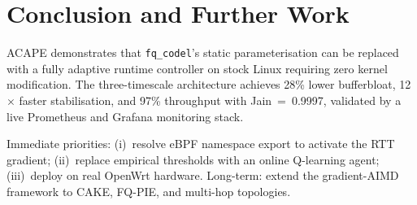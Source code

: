 \documentclass[conference]{IEEEtran}
\begin{document}
\section{Conclusion and Further Work}

ACAPE demonstrates that \texttt{fq\_codel}'s static parameterisation can be
replaced with a fully adaptive runtime controller on stock Linux requiring
zero kernel modification. The three-timescale architecture achieves 28\% lower
bufferbloat, 12$\times$ faster stabilisation, and 97\% throughput with
Jain~=~0.9997, validated by a live Prometheus and Grafana monitoring stack.

Immediate priorities: (i)~resolve eBPF namespace export to activate the RTT
gradient; (ii)~replace empirical thresholds with an online Q-learning agent;
(iii)~deploy on real OpenWrt hardware. Long-term: extend the gradient-AIMD
framework to CAKE, FQ-PIE, and multi-hop topologies.
\end{document}
